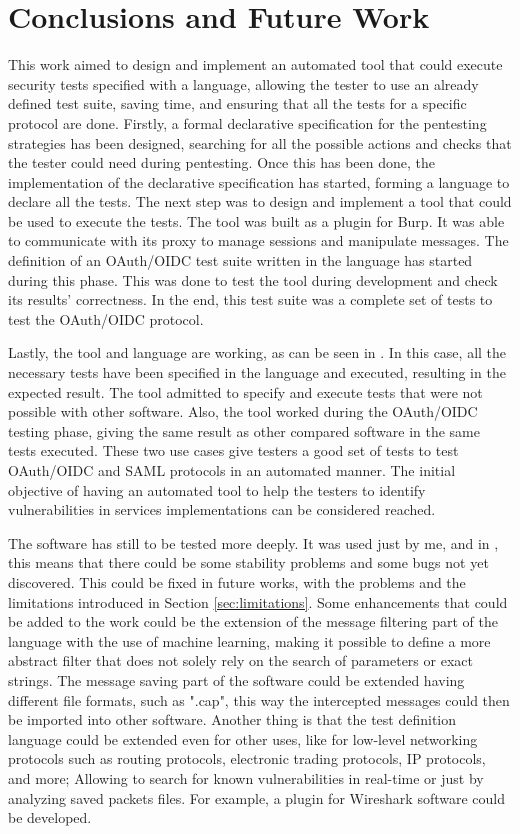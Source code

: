 \chapter{Conclusions and Future Work}
\label{chap:Conclusions}
This work aimed to design and implement an automated tool that could execute security tests specified with a language, allowing the tester to use an already defined test suite, saving time, and ensuring that all the tests for a specific protocol are done. Firstly, a formal declarative specification for the pentesting strategies has been designed, searching for all the possible actions and checks that the tester could need during pentesting. Once this has been done, the implementation of the declarative specification has started, forming a language to declare all the tests. The next step was to design and implement a tool that could be used to execute the tests. The tool was built as a plugin for Burp. It was able to communicate with its proxy to manage sessions and manipulate messages. The definition of an OAuth/OIDC test suite written in the language has started during this phase. This was done to test the tool during development and check its results' correctness. In the end, this test suite was a complete set of tests to test the OAuth/OIDC protocol.

Lastly, the tool and language are working, as can be seen in \cite{sofia_zanrosso}. In this case, all the necessary tests have been specified in the language and executed, resulting in the expected result. The tool admitted to specify and execute tests that were not possible with other software. Also, the tool worked during the OAuth/OIDC testing phase, giving the same result as other compared software in the same tests executed. These two use cases give testers a good set of tests to test OAuth/OIDC and SAML protocols in an automated manner. The initial objective of having an automated tool to help the testers to identify vulnerabilities in services implementations can be considered reached. 

The software has still to be tested more deeply. It was used just by me, and in \cite{sofia_zanrosso}, this means that there could be some stability problems and some bugs not yet discovered. This could be fixed in future works, with the problems and the limitations introduced in Section \ref{sec:limitations}. Some enhancements that could be added to the work could be the extension of the message filtering part of the language with the use of machine learning, making it possible to define a more abstract filter that does not solely rely on the search of parameters or exact strings. The message saving part of the software could be extended having different file formats, such as ".cap", this way the intercepted messages could then be imported into other software.
Another thing is that the test definition language could be extended even for other uses, like for low-level networking protocols such as routing protocols, electronic trading protocols, IP protocols, and more; Allowing to search for known vulnerabilities in real-time or just by analyzing saved packets files. For example, a plugin for Wireshark software could be developed. 




